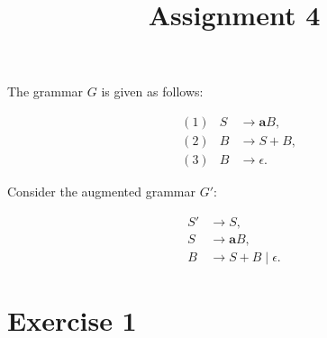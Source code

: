 \documentclass{CompilerAssignment}
\title{Assignment 4}
\newcommand{\mbfa}{\mathbf{a}}
\begin{document}
\maketitle

The grammar \(G\) is given as follows:

\begin{equation*}
    \begin{aligned}
        & (1) & S & \rightarrow \mbfa B, \\
        & (2) & B & \rightarrow S + B, \\
        & (3) & B & \rightarrow \epsilon.
    \end{aligned}
\end{equation*}

Consider the augmented grammar \(G'\):

\begin{equation*}
    \begin{aligned}
        S' & \rightarrow S, \\
        S & \rightarrow \mbfa B, \\
        B & \rightarrow S + B \mid \epsilon.
    \end{aligned}
\end{equation*}

\section{Exercise 1}
\end{document}
